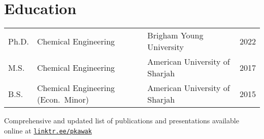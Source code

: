 \documentclass[letterpaper,12pt]{article}
\begin{document}
\section*{Education}%
\vspace{-0.3\baselineskip}
\begin{tabular}{@{}p{} p{} p{} r@{}}
  Ph.D.   & Chemical Engineering        & Brigham Young University       & 2022 \\ %
  M.S.    &  Chemical Engineering       & American University of Sharjah & 2017 \\ %
  B.S.    & Chemical Engineering (Econ.~Minor) & American University of Sharjah & 2015 \\ %
\end{tabular}

\vspace{0.2\baselineskip}
\begin{center}
  \begin{footnotesize}
    Comprehensive and updated list of publications and presentations available online at \href{https://linktr.ee/pkawak}{\tt linktr.ee/pkawak}\\
  \end{footnotesize}
\end{center}
\end{document}
